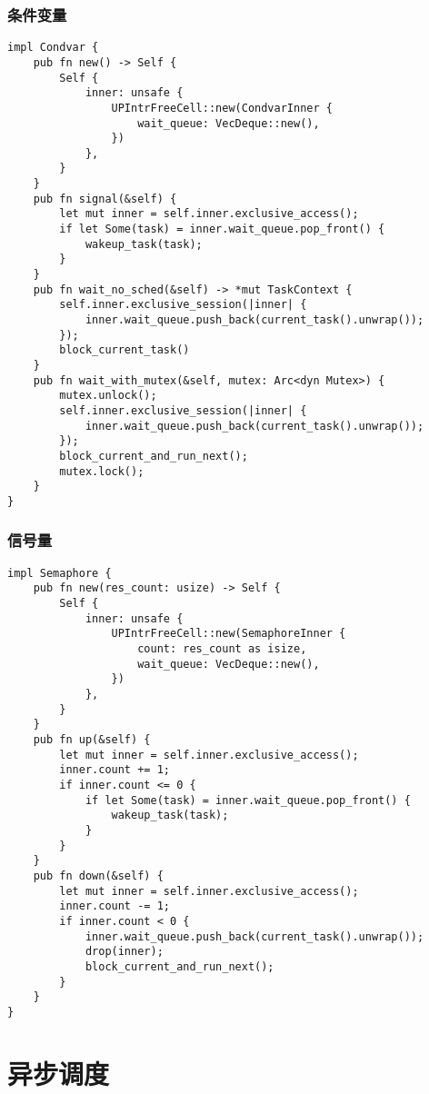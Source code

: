 \subsubsection{条件变量}

\begin{lstlisting}[caption=条件变量的实现]
impl Condvar {
    pub fn new() -> Self {
        Self {
            inner: unsafe {
                UPIntrFreeCell::new(CondvarInner {
                    wait_queue: VecDeque::new(),
                })
            },
        }
    }
    pub fn signal(&self) {
        let mut inner = self.inner.exclusive_access();
        if let Some(task) = inner.wait_queue.pop_front() {
            wakeup_task(task);
        }
    }
    pub fn wait_no_sched(&self) -> *mut TaskContext {
        self.inner.exclusive_session(|inner| {
            inner.wait_queue.push_back(current_task().unwrap());
        });
        block_current_task()
    }
    pub fn wait_with_mutex(&self, mutex: Arc<dyn Mutex>) {
        mutex.unlock();
        self.inner.exclusive_session(|inner| {
            inner.wait_queue.push_back(current_task().unwrap());
        });
        block_current_and_run_next();
        mutex.lock();
    }
}
\end{lstlisting}

\subsubsection{信号量}

\begin{lstlisting}[caption=信号量的实现]
impl Semaphore {
    pub fn new(res_count: usize) -> Self {
        Self {
            inner: unsafe {
                UPIntrFreeCell::new(SemaphoreInner {
                    count: res_count as isize,
                    wait_queue: VecDeque::new(),
                })
            },
        }
    }
    pub fn up(&self) {
        let mut inner = self.inner.exclusive_access();
        inner.count += 1;
        if inner.count <= 0 {
            if let Some(task) = inner.wait_queue.pop_front() {
                wakeup_task(task);
            }
        }
    }
    pub fn down(&self) {
        let mut inner = self.inner.exclusive_access();
        inner.count -= 1;
        if inner.count < 0 {
            inner.wait_queue.push_back(current_task().unwrap());
            drop(inner);
            block_current_and_run_next();
        }
    }
}
\end{lstlisting}

\section{异步调度}

